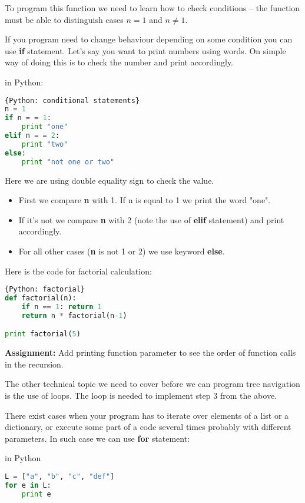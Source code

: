To program this function we need to learn how to check conditions --
the function must be able to distinguish cases $n = 1$ and $n\neq 1$.

If you program need to change behaviour depending on some condition
you can use \textbf{if} statement.
Let's say you want to print numbers using words. On simple way of doing
this is to check the number and print accordingly.

in Python:
\begin{lstlisting}[style=codelst,language=Python]{Python: conditional statements}
n = 1
if n = = 1:
    print "one"
elif n = = 2:
    print "two"
else:
    print "not one or two"
\end{lstlisting}
Here we are using double equality sign to check the value.
\begin{itemize}
\item First we compare \textbf{n} with 1.
If n is equal to 1 we print the word "one".
\item If it's not we compare \textbf{n} with 2 (note the use of \textbf{elif} statement)
and print accordingly.
\item For all other cases (\textbf{n} is not 1 or 2) we use keyword \textbf{else}.
\end{itemize}

Here is the code for factorial calculation:
\begin{lstlisting}[style=codelst,language=Python]{Python: factorial}
def factorial(n):
    if n == 1: return 1
    return n * factorial(n-1)

print factorial(5)
\end{lstlisting}

\bigskip
\begin{tcolorbox}
\textbf{Assignment:} 
Add printing function parameter to see the order of function calls
in the recursion.
\end{tcolorbox}

The other technical topic we need to cover before we can program
tree navigation is the use of loops. The loop is needed to implement
step 3 from the above.

There exist cases when your program has to iterate over elements
of a list or a dictionary, or execute some part of a code several times
probably with different parameters. In such case we can use \textbf{for}
statement:

in Python
\begin{lstlisting}[style=codelst,language=Python]
L = ["a", "b", "c", "def"]
for e in L:
    print e
\end{lstlisting}

